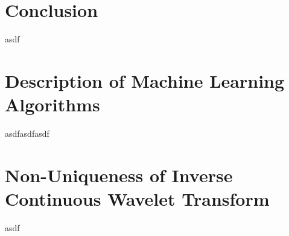 \documentclass[10pt]{article}
\begin{document}
\section{Conclusion}
asdf




\appendix
\section{Description of Machine Learning Algorithms}\label{ml algo}
asdfasdfasdf

\section{Non-Uniqueness of Inverse Continuous Wavelet Transform}\label{inverse cwt}
asdf
\end{document}
